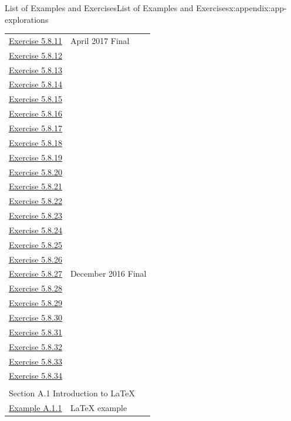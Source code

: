 \documentclass[oneside,10pt,]{book}
\numberwithin{equation}{section}
\begin{document}
\begin{appendixptx}{List of Examples and Exercises}{}{List of Examples and Exercises}{}{}{x:appendix:app-explorations}
\begin{longtable}[l]{ll}
\hyperlink{g:exercise:id492904}{Exercise 5.8.11}& April 2017 Final\\
\hyperlink{g:exercise:id492874}{Exercise 5.8.12}& \\
\hyperlink{g:exercise:id492916}{Exercise 5.8.13}& \\
\hyperlink{g:exercise:id492979}{Exercise 5.8.14}& \\
\hyperlink{g:exercise:id492951}{Exercise 5.8.15}& \\
\hyperlink{g:exercise:id492972}{Exercise 5.8.16}& \\
\hyperlink{x:exercise:ex-any-isomorphic}{Exercise 5.8.17}& \\
\hyperlink{x:exercise:ex-complement-deg-sequence}{Exercise 5.8.18}& \\
\hyperlink{g:exercise:id493023}{Exercise 5.8.19}& \\
\hyperlink{g:exercise:id493038}{Exercise 5.8.20}& \\
\hyperlink{g:exercise:id493029}{Exercise 5.8.21}& \\
\hyperlink{g:exercise:id493036}{Exercise 5.8.22}& \\
\hyperlink{x:exercise:ex-path-transitive}{Exercise 5.8.23}& \\
\hyperlink{x:exercise:ex-connectedness-relation}{Exercise 5.8.24}& \\
\hyperlink{g:exercise:id493148}{Exercise 5.8.25}& \\
\hyperlink{g:exercise:id493147}{Exercise 5.8.26}& \\
\hyperlink{x:exercise:ex-deg-connected}{Exercise 5.8.27}& December 2016 Final\\
\hyperlink{g:exercise:id493195}{Exercise 5.8.28}& \\
\hyperlink{g:exercise:id493206}{Exercise 5.8.29}& \\
\hyperlink{g:exercise:id493233}{Exercise 5.8.30}& \\
\hyperlink{g:exercise:id493252}{Exercise 5.8.31}& \\
\hyperlink{g:exercise:id493248}{Exercise 5.8.32}& \\
\hyperlink{g:exercise:id493294}{Exercise 5.8.33}& \\
\hyperlink{g:exercise:id493282}{Exercise 5.8.34}& \\
\multicolumn{2}{l}{\null}\\[1.5ex] \multicolumn{2}{l}{\large Section A.1 Introduction to \LaTeX{}}\\[0.5ex]
\hyperref[x:example:eg-latex]{Example A.1.1}& \LaTeX{} example\\
\end{longtable}
\end{appendixptx}
\end{document}
